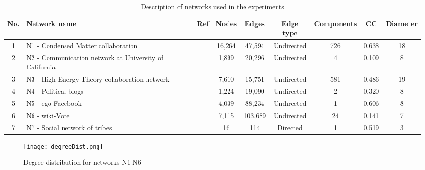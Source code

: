 \documentclass[11pt]{article} %
\begin{document}
\begin{table}[t]
\centering
\begin{tabular}{ c p{3.2cm} c c c c c c c} 
\hline
\textbf{No.} & \textbf{Network name} & \textbf{Ref} & \textbf {Nodes} & \textbf {Edges} & \textbf{Edge type} & \textbf{Components} & \textbf{CC} & \textbf {Diameter} \\ 
\hline
1 & N1 - Condensed Matter collaboration & \cite{newman2001scientific} & 16,264 & 47,594 & Undirected & 726 & 0.638 & 18 \\ \hline
2 & N2 - Communication network at University of California & \cite{opsahl2009clustering} & 1,899 & 20,296 & Undirected  & 4 & 0.109 & 8 \\ \hline
3 & N3 - High-Energy Theory collaboration network & \cite{newman2001structure} & 7,610 & 15,751 & Undirected & 581 & 0.486 & 19 \\ \hline
4 & N4 - Political blogs & \cite{adamic2005political} & 1,224 & 19,090 & Undirected & 2 & 0.320 & 8 \\ \hline
5 & N5 - ego-Facebook  & \cite{leskovec2012learning} & 4,039 & 88,234 & Undirected & 1 & 0.606 & 8 \\ \hline
6 & N6 - wiki-Vote & \cite{leskovec2010predicting} & 7,115 & 103,689 & Undirected & 24 & 0.141 & 7 \\ \hline \hline
7 & N7 - Social network of tribes & \cite{read1954cultures} & 16 & 114 & Directed & 1 & 0.519 & 3 \\ \hline

\end{tabular}
\caption {Description of  networks used in the experiments}
\label{tab:network stats} 
\end {table}


\begin{figure*}[!htb]
\centering
\texttt{[image: degreeDist.png]}
\caption{Degree distribution for networks N1-N6}
\label{fig:degreeDist}

\end{figure*}
\end{document}
